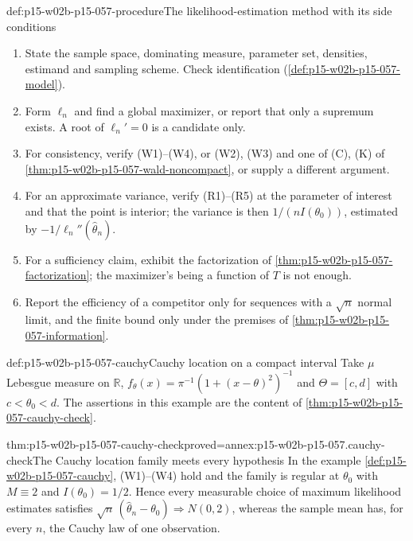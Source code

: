 \begin{hbmethod}{def:p15-w02b-p15-057-procedure}{The likelihood-estimation method with its side conditions}
\begin{enumerate}
\item State the sample space, dominating measure, parameter set,
 densities, estimand and sampling scheme. Check identification
 (\cref{def:p15-w02b-p15-057-model}).
\item Form \(\ell_n\) and find a global maximizer, or report that only a
 supremum exists. A root of \(\ell_n'=0\) is a candidate only.
\item For consistency, verify (W1)--(W4), or (W2), (W3) and one of (C), (K)
 of \cref{thm:p15-w02b-p15-057-wald-noncompact}, or supply a different
 argument.
\item For an approximate variance, verify (R1)--(R5) at the parameter of
 interest and that the point is interior; the variance is then
 \(1/(nI(\theta_0))\), estimated by \(-1/\ell_n''(\widehat\theta_n)\).
\item For a sufficiency claim, exhibit the factorization of
 \cref{thm:p15-w02b-p15-057-factorization}; the maximizer's being a
 function of \(T\) is not enough.
\item Report the efficiency of a competitor only for sequences with a
 \(\sqrt n\) normal limit, and the finite bound only under the premises of
 \cref{thm:p15-w02b-p15-057-information}.
\end{enumerate}
\end{hbmethod}

\begin{hbexample}{def:p15-w02b-p15-057-cauchy}{Cauchy location on a compact interval}
Take \(\mu\) Lebesgue measure on \(\mathbb R\),
\(f_\theta(x)=\pi^{-1}(1+(x-\theta)^2)^{-1}\) and \(\Theta=[c,d]\) with
\(c<\theta_0<d\). The assertions in this example are the content of
\cref{thm:p15-w02b-p15-057-cauchy-check}.
\end{hbexample}

\begin{hbtheorem}{thm:p15-w02b-p15-057-cauchy-check}{proved=annex:p15-w02b-p15-057.cauchy-check}{The Cauchy location family meets every hypothesis}
In the example \cref{def:p15-w02b-p15-057-cauchy}, (W1)--(W4) hold and
the family is regular at \(\theta_0\) with \(M\equiv2\) and
\(I(\theta_0)=1/2\). Hence every measurable choice of maximum likelihood
estimates satisfies
\(\sqrt n\,(\widehat\theta_n-\theta_0)\Rightarrow N(0,2)\), whereas the
sample mean has, for every \(n\), the Cauchy law of one observation.
\end{hbtheorem}

